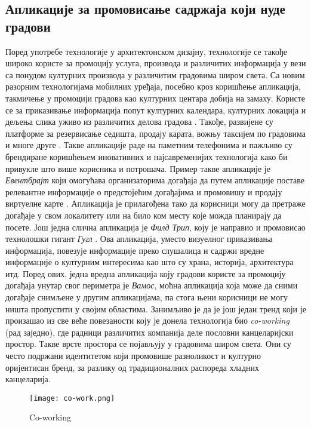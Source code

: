 \documentclass{article}
\begin{document}
\subsection{Апликације за промовисање садржаја који нуде градови}
Поред употребе технологије у архитектонском дизајну, технологије се такође широко користе за промоцију услуга, производа и различитих информација у вези са понудом културних производа у различитим градовима широм света. Са новим разорним технологијама мобилних уређаја, посебно кроз коришћење апликација, такмичење у промоцији градова као културних центара добија на замаху. Користе се за приказивање информација попут културних календара, културних локација и дељења слика уживо из различитих делова градова \cite{pietrol}. Такође, развијене су платформе за резервисање седишта, продају карата, вожњу таксијем по градовима и многе друге \cite{mckinsey}. Такве апликације раде на паметним телефонима и пажљиво су  брендиране коришћењем иновативних и најсавременијих технологија како би привукле што више корисника и потрошача. Пример такве апликације је \textit{Евентбрајт} који омогућава организаторима догађаја да путем апликације поставе релевантне информације о предстојећим догађајима и промовишу и продају виртуелне карте \cite{jamaluddina}. Апликација је прилагођена тако да корисници могу да претраже догађаје у свом локалитету или на било ком месту које можда планирају да посете. Још једна слична апликација је \textit{Филд Трип}, коју је направио и промовисао технолошки гигант \textit{Гугл} \cite{ingrahamn}. Ова апликација, уместо визуелног приказивања информација, повезује информације преко слушалица и садржи вредне информације о културним интересима као што су храна, историја, архитектура итд. Поред ових, једна вредна апликација коју градови користе за промоцију догађаја унутар свог периметра је \textit{Вамос}, моћна апликација која може да сними догађаје снимљене у другим апликацијама, па стога њени корисници не могу ништа пропустити у својим областима. Занимљиво је да је још један тренд који је произашао из све веће повезаности коју је донела технологија био \textit{co-working} (рад заједно), где радници различитих компанија деле пословни канцеларијски простор. Такве врсте простора се појављују у градовима широм света. Они су често подржани идентитетом који промовише разноликост и културно оријентисан бренд, за разлику од традиционалних распореда хладних канцеларија.

\begin{figure}[H]
\centering
\texttt{[image: co-work.png]}
\caption{Co-working}
\end{figure}
\end{document}
